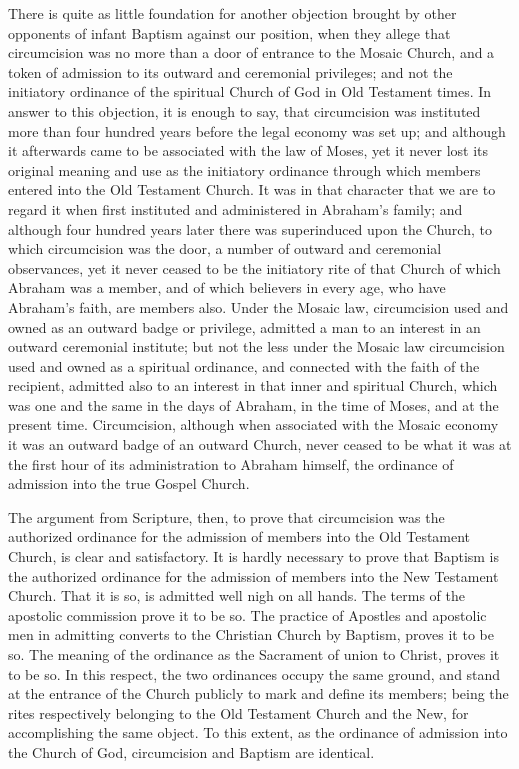\documentclass[
]{book}
\begin{document}
There is quite as little foundation for another objection brought by other opponents of infant Baptism against our position, when they allege that circumcision was no more than a door of entrance to the Mosaic Church, and a token of admission to its outward and ceremonial privileges; and not the initiatory ordinance of the spiritual Church of God in Old Testament times. In answer to this objection, it is enough to say, that circumcision was instituted more than four hundred years before the legal economy was set up; and although it afterwards came to be associated with the law of Moses, yet it never lost its original meaning and use as the initiatory ordinance through which members entered into the Old Testament Church. It was in that character that we are to regard it when first instituted and administered in Abraham's family; and although four hundred years later there was superinduced upon the Church, to which circumcision was the door, a number of outward and ceremonial observances, yet it never ceased to be the initiatory rite of that Church of which Abraham was a member, and of which believers in every age, who have Abraham's faith, are members also. Under the Mosaic law, circumcision used and owned as an outward badge or privilege, admitted a man to an interest in an outward ceremonial institute; but not the less under the Mosaic law circumcision used and owned as a spiritual ordinance, and connected with the faith of the recipient, admitted also to an interest in that inner and spiritual Church, which was one and the same in the days of Abraham, in the time of Moses, and at the present time. Circumcision, although when associated with the Mosaic economy it was an outward badge of an outward Church, never ceased to be what it was at the first hour of its administration to Abraham himself, the ordinance of admission into the true Gospel Church.

The argument from Scripture, then, to prove that circumcision was the authorized ordinance for the admission of members into the Old Testament Church, is clear and satisfactory. It is hardly necessary to prove that Baptism is the authorized ordinance for the admission of members into the New Testament Church. That it is so, is admitted well nigh on all hands. The terms of the apostolic commission prove it to be so. The practice of Apostles and apostolic men in admitting converts to the Christian Church by Baptism, proves it to be so. The meaning of the ordinance as the Sacrament of union to Christ, proves it to be so. In this respect, the two ordinances occupy the same ground, and stand at the entrance of the Church publicly to mark and define its members; being the rites respectively belonging to the Old Testament Church and the New, for accomplishing the same object. To this extent, as the ordinance of admission into the Church of God, circumcision and Baptism are identical.
\end{document}
